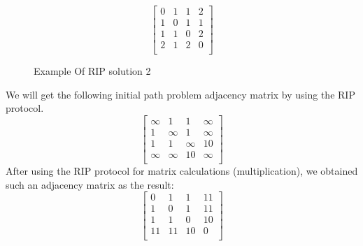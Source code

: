 \documentclass[a4paper,12pt,twoside,openright]{report}
\begin{document}
\[
\begin{bmatrix}
    0 & 1 & 1 & 2 \\
    1 & 0 & 1 & 1 \\
    1 & 1 & 0 & 2 \\
    2 & 1 & 2 & 0 \\
\end{bmatrix}
\]
\begin{figure}[H]
\centering
{}
\label{example:rip:2}
\caption{Example Of RIP solution 2}
\end{figure}
We will get the following initial path problem adjacency matrix by using the RIP protocol.
\[
\begin{bmatrix}
    \infty & 1 & 1 & \infty \\
    1 & \infty & 1 & \infty \\
    1 & 1 & \infty & 10 \\
    \infty & \infty & 10 & \infty \\
\end{bmatrix}
\]
After using the RIP protocol for matrix calculations (multiplication), we obtained such an adjacency matrix as the result:
\[
\begin{bmatrix}
    0 & 1 & 1 & 11 \\
    1 & 0 & 1 & 11 \\
    1 & 1 & 0 & 10 \\
    11 & 11 & 10 & 0 \\
\end{bmatrix}
\]
\end{document}
